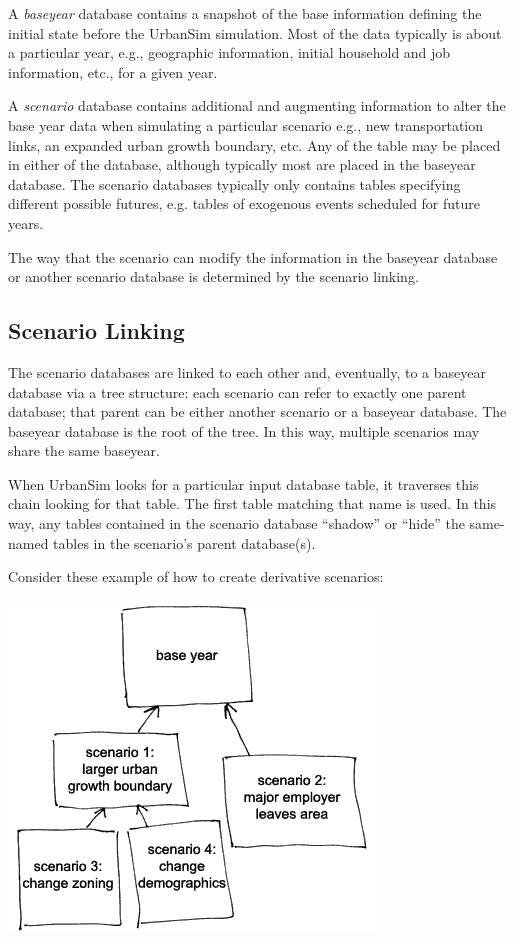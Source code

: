 A \emph{baseyear} database contains a snapshot of the base
information defining the initial state before the UrbanSim
simulation. Most of the data typically is about a particular year,
e.g., geographic information, initial household and job information,
etc., for a given year.

A \emph{scenario} database contains additional and augmenting information to
alter the base year data when simulating a particular scenario e.g., new
transportation links, an expanded urban growth boundary, etc. Any of the table
may be placed in either of the database, although typically most are placed in
the baseyear database.  The scenario databases typically only contains tables
specifying different possible futures, e.g. tables of exogenous events
scheduled for future years.

The way that the scenario can modify the information in the baseyear database or
another scenario database is determined by the scenario linking.

\subsection{Scenario Linking}

The scenario databases are linked to each other and, eventually, to a baseyear
database via a tree structure: each scenario can refer to exactly one parent
database; that parent can be either another scenario or a baseyear database.
The baseyear database is the root of the tree.  In this way, multiple scenarios
may share the same baseyear.

When UrbanSim looks for a particular input database table, it traverses this
chain looking for that table.  The first table matching that name is used.  In
this way, any tables contained in the scenario database ``shadow'' or ``hide''
the same-named tables in the scenario's parent database(s).

Consider these example of how to create derivative scenarios:\\

\begin{center}
\includegraphics*{scenarios}
\end{center}

